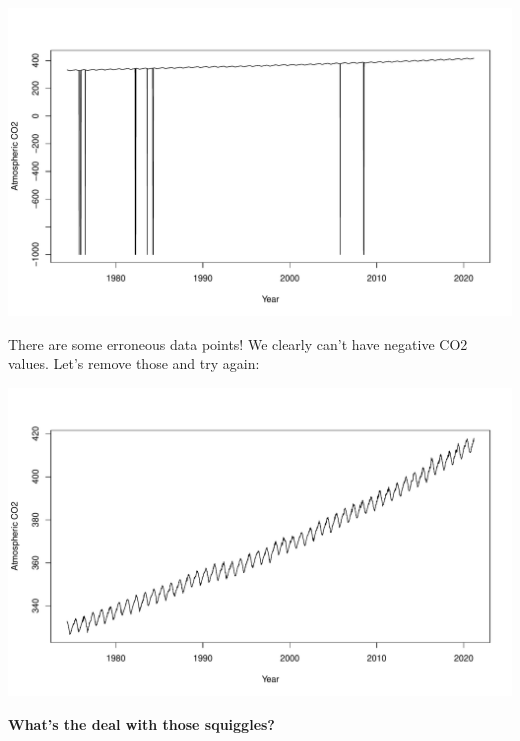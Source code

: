 \documentclass[
]{book}
\newenvironment{Shaded}{\begin{snugshade}}{\end{snugshade}}
\newcommand{\DataTypeTok}[1]{\textcolor[rgb]{0.13,0.29,0.53}{#1}}
\newcommand{\DecValTok}[1]{\textcolor[rgb]{0.00,0.00,0.81}{#1}}
\newcommand{\KeywordTok}[1]{\textcolor[rgb]{0.13,0.29,0.53}{\textbf{#1}}}
\newcommand{\NormalTok}[1]{#1}
\newcommand{\OperatorTok}[1]{\textcolor[rgb]{0.81,0.36,0.00}{\textbf{#1}}}
\newcommand{\StringTok}[1]{\textcolor[rgb]{0.31,0.60,0.02}{#1}}
\begin{document}
\includegraphics{figures/unnamed-chunk-255-1.pdf}

There are some erroneous data points! We clearly can't have negative CO2 values. Let's remove those and try again:

\begin{Shaded}
\end{Shaded}

\includegraphics{figures/unnamed-chunk-256-1.pdf}

\textbf{What's the deal with those squiggles?}
\end{document}
